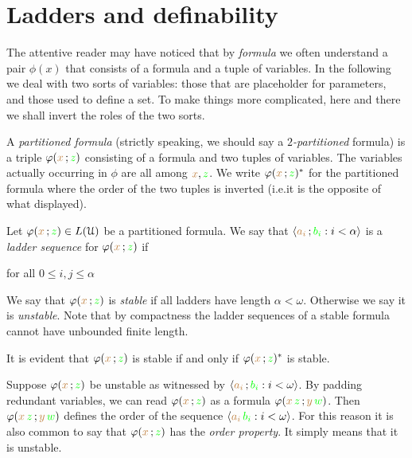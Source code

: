 \documentclass[creche.tex]{subfiles}
\begin{document}
\section{Ladders and definability}

The attentive reader may have noticed that by \textit{formula\/} we often understand a pair $\phi(x)$ that consists of a formula and a tuple of variables.
In the following we deal with two sorts of variables: those that are placeholder for parameters, and those used to define a set.
To make things more complicated, here and there we shall invert the roles of the two sorts.

\begin{definition}\label{def_partitioned-fla}
A \emph{partitioned formula\/}  (strictly speaking, we should say a \emph{$2$-partitioned\/} formula) is a triple $\varphi({\color{brown} x}\,;{\color{green} z})$ consisting of a formula and two tuples of variables. The variables actually occurring in $\phi$ are all among ${\color{brown} x},{\color{green} z}$. We write $\varphi({\color{brown} x}\,;{\color{green} z})^*$ for the partitioned formula where the order of the two tuples is inverted (i.e.\@ it is the opposite of what displayed).
\end{definition}

Let $\varphi({\color{brown} x}\,;{\color{green} z})\in L(\EuScript U)$ be a partitioned formula. We say that $\langle{\color{brown}a_i}\,;{\color{green} b_i} : i<\alpha\rangle$ is a \emph{ladder sequence\/} for $\varphi({\color{brown} x}\,;{\color{green} z})$ if 

\hfill for all $0\le i,j\le\alpha$

We say that $\varphi({\color{brown} x}\,;{\color{green} z})$ is \emph{stable\/} if all ladders have length $\alpha<\omega$. Otherwise we say it is \emph{unstable}. Note that by compactness the ladder sequences of a stable formula cannot have unbounded finite length. 

It is evident that $\varphi({\color{brown} x}\,;{\color{green} z})$ is stable if and only if $\varphi({\color{brown} x}\,;{\color{green} z})^*$ is stable.

Suppose $\varphi({\color{brown} x}\,;{\color{green} z})$ be unstable as witnessed by $\langle{\color{brown}a_i}\,;{\color{green} b_i} : i<\omega\rangle$. By padding redundant variables, we can read $\varphi({\color{brown} x}\,;{\color{green} z})$ as a formula $\varphi({\color{brown} x}\,{\color{green} z}\,;{\color{brown} y}\,{\color{green} w})$. Then $\varphi({\color{brown} x}\,{\color{green} z}\,;{\color{brown} y}\,{\color{green} w})$ defines the order of the sequence $\langle{\color{brown}a_i}\,{\color{green} b_i} : i<\omega\rangle$. For this reason it is also common to say that $\varphi({\color{brown} x}\,;{\color{green} z})$ has the \emph{order property}. It simply means that it is unstable. 
\end{document}
